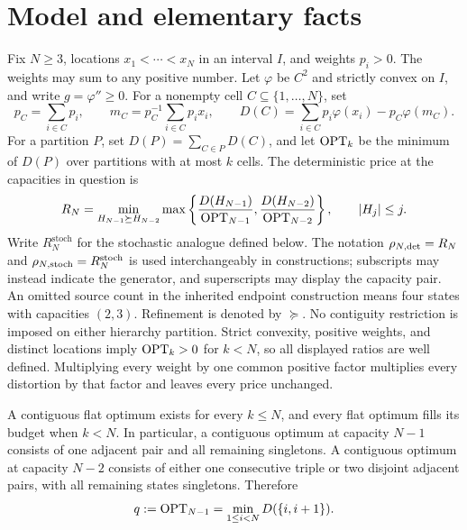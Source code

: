 \section{Model and elementary facts}


Fix $N\ge3$, locations $x_1<\cdots<x_N$ in an interval $I$, and weights
$p_i>0$. The weights may sum to any positive number. Let $\varphi$ be
$C^2$ and strictly convex on $I$, and write $g=\varphi''\ge0$.
For a nonempty cell $C\subseteq\{1,\ldots,N\}$, set
\[
 p_C=\sum_{i\in C}p_i,\qquad
 m_C=p_C^{-1}\sum_{i\in C}p_ix_i,\qquad
 D(C)=\sum_{i\in C}p_i\varphi(x_i)-p_C\varphi(m_C).
\]
For a partition $P$, set $D(P)=\sum_{C\in P}D(C)$, and let
$\operatorname{OPT}_k$ be the minimum of $D(P)$ over partitions with at most $k$ cells.
The deterministic price at the capacities in question is
\[
 R_N=\min_{H_{N-1}\succeq H_{N-2}}
 \max\left\{
 \frac{D(H_{N-1})}{\operatorname{OPT}_{N-1}},
 \frac{D(H_{N-2})}{\operatorname{OPT}_{N-2}}\right\},
 \qquad |H_j|\le j.
\]
Write $R_N^{\mathrm{stoch}}$ for the stochastic analogue defined below.
The notation $\rho_{N,\mathrm{det}}=R_N$ and
$\rho_{N,\mathrm{stoch}}=R_N^{\mathrm{stoch}}$ is used interchangeably in constructions;
subscripts may instead indicate the generator, and superscripts may
display the capacity pair. An omitted source count in the inherited
endpoint construction means four states with capacities $(2,3)$.
Refinement is denoted by $\succeq$. No contiguity restriction is imposed
on either hierarchy partition. Strict convexity, positive weights, and
distinct locations imply $\operatorname{OPT}_k>0$ for $k<N$, so all displayed ratios
are well defined. Multiplying every weight by one common positive factor
multiplies every distortion by that factor and leaves every price unchanged.

\begin{lemma}
\label{lem:flat}
A contiguous flat optimum exists for every $k\le N$, and every flat
optimum fills its budget when $k<N$. In particular, a contiguous optimum
at capacity $N-1$ consists of one adjacent pair and all remaining
singletons. A contiguous optimum at capacity $N-2$ consists of either
one consecutive triple or two disjoint adjacent pairs, with all remaining
states singletons. Therefore
\[
 q:=\operatorname{OPT}_{N-1}=\min_{1\le i<N}D(\{i,i+1\}).
\]
\end{lemma}

